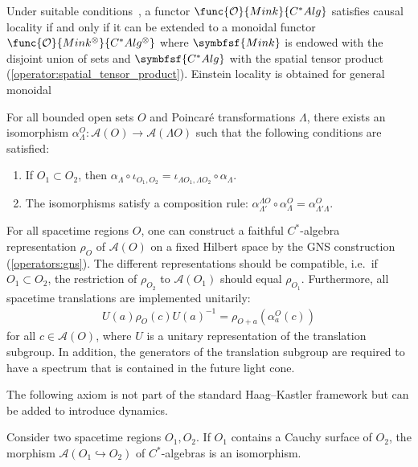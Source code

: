     \begin{property}
        Under suitable conditions~\citep{brunetti_locality_2012}, a functor $\func{\mathcal{O}}{Mink}{C^*Alg}$ satisfies causal locality if and only if it can be extended to a monoidal functor $\func{\mathcal{O}}{Mink^\otimes}{C^*Alg^\otimes}$ where $\symbfsf{Mink}$ is endowed with the disjoint union of sets and $\symbfsf{C^*Alg}$ with the spatial tensor product (\cref{operator:spatial_tensor_product}). Einstein locality is obtained for general monoidal
    \end{property}

    \begin{axiom}
        For all bounded open sets $O$ and Poincar\'e transformations $\Lambda$, there exists an isomorphism $\alpha^O_\Lambda:\mathcal{A}(O)\rightarrow\mathcal{A}(\Lambda O)$ such that the following conditions are satisfied:
        \begin{enumerate}
            \item If $O_1\subset O_2$, then $\alpha_\Lambda\circ\iota_{O_1,O_2} = \iota_{\Lambda O_1,\Lambda O_2}\circ\alpha_\Lambda$.
            \item The isomorphisms satisfy a composition rule: $\alpha^{\Lambda O}_{\Lambda'}\circ\alpha^O_\Lambda = \alpha^O_{\Lambda'\Lambda}$.
        \end{enumerate}
    \end{axiom}

    \begin{axiom}[Spectrum]
        For all spacetime regions $O$, one can construct a faithful $C^*$-algebra representation $\rho_O$ of $\mathcal{A}(O)$ on a fixed Hilbert space by the GNS construction (\cref{operators:gns}). The different representations should be compatible, i.e.~if $O_1\subset O_2$, the restriction of $\rho_{O_2}$ to $\mathcal{A}(O_1)$ should equal $\rho_{O_1}$. Furthermore, all spacetime translations are implemented unitarily:
        \begin{gather}
            U(a)\rho_O(c)U(a)^{-1} = \rho_{O+a}\left(\alpha^O_a(c)\right)
        \end{gather}
        for all $c\in\mathcal{A}(O)$, where $U$ is a unitary representation of the translation subgroup. In addition, the generators of the translation subgroup are required to have a spectrum that is contained in the future light cone.
    \end{axiom}

    The following axiom is not part of the standard Haag--Kastler framework but can be added to introduce dynamics.
    \begin{axiom}
        Consider two spacetime regions $O_1,O_2$. If $O_1$ contains a Cauchy surface of $O_2$, the morphism $\mathcal{A}(O_1\hookrightarrow O_2)$ of $C^*$-algebras is an isomorphism.
    \end{axiom}

